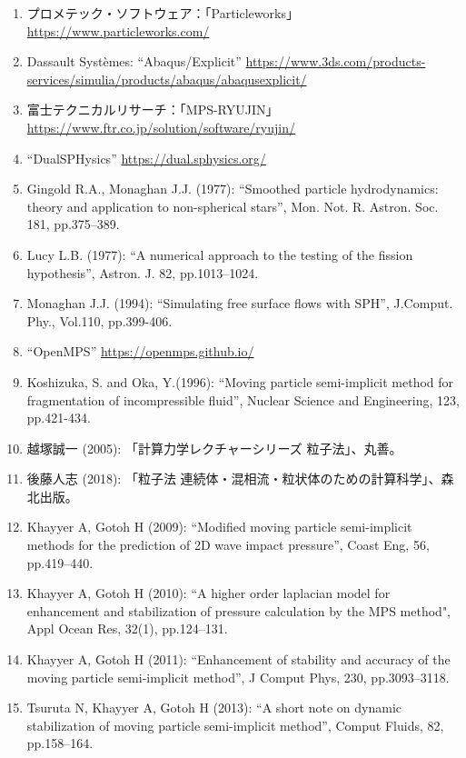 \begin{enumerate}
    \item プロメテック・ソフトウェア：「Particleworks」\url{https://www.particleworks.com/} \label{ref:particleworks}
    \item Dassault Systèmes: ``Abaqus/Explicit'' \url{https://www.3ds.com/products-services/simulia/products/abaqus/abaqusexplicit/} \label{ref:abaqus}
    \item 富士テクニカルリサーチ：「MPS-RYUJIN」\url{https://www.ftr.co.jp/solution/software/ryujin/} \label{ref:ryujin}
	\item ``DualSPHysics'' \url{https://dual.sphysics.org/} \label{ref:dualsphysics}
	\item Gingold R.A., Monaghan J.J. (1977): ``Smoothed particle hydrodynamics: theory and application to non-spherical stars'', Mon. Not. R. Astron. Soc. 181, pp.375–389. \label{ref:sph1}
	\item Lucy L.B. (1977): ``A numerical approach to the testing of the fission hypothesis'', Astron. J. 82, pp.1013–1024. \label{ref:sph2}
	\item Monaghan J.J. (1994): ``Simulating free surface flows with SPH'', J.Comput. Phy., Vol.110, pp.399-406. \label{ref:wcsph}
	\item ``OpenMPS'' \url{https://openmps.github.io/} \label{ref:openmps}
	\item Koshizuka, S. and Oka, Y.(1996): ``Moving particle semi-implicit method for fragmentation of incompressible fluid'', Nuclear Science and Engineering, 123, pp.421-434. \label{ref:mps}
	\item 越塚誠一 (2005): 「計算力学レクチャーシリーズ 粒子法」、丸善。 \label{ref:koshizuka2005}
	\item 後藤人志 (2018): 「粒子法 連続体・混相流・粒状体のための計算科学」、森北出版。 \label{ref:gotoh2018}
	\item Khayyer A, Gotoh H (2009): ``Modified moving particle semi-implicit methods for the prediction of 2D wave impact pressure'', Coast Eng, 56, pp.419–440. \label{ref:Khayyer2009}
	\item Khayyer A, Gotoh H (2010): ``A higher order laplacian model for enhancement and stabilization of pressure calculation by the MPS method", Appl Ocean Res, 32(1), pp.124–131. \label{ref:Khayyer2010}
	\item Khayyer A, Gotoh H (2011): ``Enhancement of stability and accuracy of the moving particle semi-implicit method'', J Comput Phys, 230, pp.3093–3118. \label{ref:Khayyer2011}
	\item Tsuruta N, Khayyer A, Gotoh H (2013): ``A short note on dynamic stabilization of moving particle semi-implicit method'', Comput Fluids, 82, pp.158–164. \label{ref:Tsuruta2013}

\end{enumerate}
